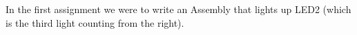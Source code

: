 In the first assignment we were to write an Assembly that lights up LED2 (which is the third light counting from the right).
